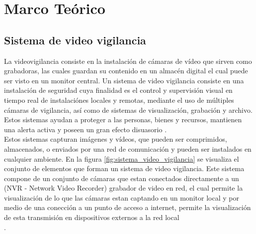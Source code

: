 \chapter{Marco Teórico}


\section{Sistema de video vigilancia}
La videovigilancia consiste en la instalación de cámaras de vídeo que sirven como grabadoras, las cuales guardan su contenido en un almacén digital el cual puede ser visto en un monitor central. Un sistema de video vigilancia consiste en una instalación de seguridad cuya finalidad es el control y supervisión visual en tiempo real de instalaciónes locales y remotas, mediante el uso de múltiples cámaras de vigilancia, así como de sistemas de visualización, grabación y archivo. Estos sistemas ayudan a proteger a las personas, bienes y recursos, mantienen una alerta activa y poseen un gran efecto disuasorio \cite{wikipedia:vvigilancia}.\\

Estos sistemas capturan imágenes y vídeos, que pueden ser comprimidos, almacenados, o enviados por una red de comunicación y pueden ser instalados en cualquier ambiente. En la figura \ref{fig:sistema_video_vigilancia} se visualiza el conjunto de elementos que forman un sistema de video vigilancia. Este sistema compone de un conjunto de cámaras que estan conectados directamente a un (NVR - Network Video Recorder) grabador de video en red, el cual permite la visualización de lo que las cámaras estan captando en un monitor local y por medio de una conección a un punto de acceso a internet, permite la visualización de esta transmisión en dispositivos externos a la red local\\.


